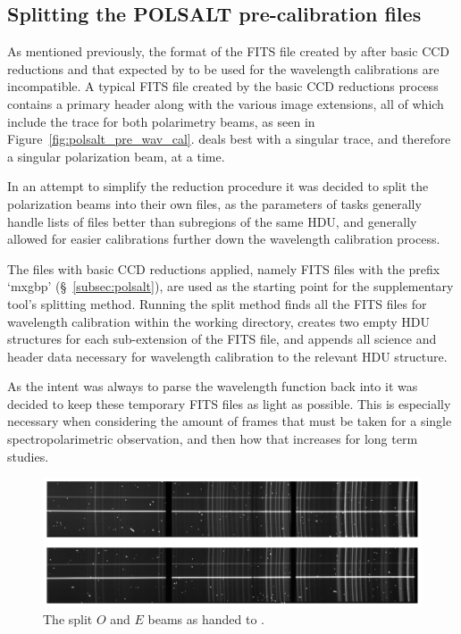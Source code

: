 \subsection{Splitting the POLSALT pre-calibration files}

As mentioned previously, the format of the \gls{FITS} file created by \polsalt after basic \gls{CCD} reductions and that expected by \iraf to be used for the wavelength calibrations are incompatible. A typical \gls{FITS} file created by the \polsalt basic \gls{CCD} reductions process contains a primary header along with the various image extensions, all of which include the trace for both polarimetry beams, as seen in Figure~\ref{fig:polsalt_pre_wav_cal}. \iraf deals best with a singular trace, and therefore a singular polarization beam, at a time.
\prgph

In an attempt to simplify the \iraf reduction procedure it was decided to split the polarization beams into their own files, as the parameters of \iraf tasks generally handle lists of files better than subregions of the same \gls{HDU}, and generally allowed for easier calibrations further down the \iraf wavelength calibration process.
\prgph

The \polsalt files with basic \gls{CCD} reductions applied, namely \gls{FITS} files with the prefix `mxgbp' (\S~\ref{subsec:polsalt}), are used as the starting point for the supplementary tool's splitting method. Running the split method finds all the \gls{FITS} files for wavelength calibration within the working directory, creates two empty \gls{HDU} structures for each sub-extension of the \gls{FITS} file, and appends all science and header data necessary for wavelength calibration to the relevant \gls{HDU} structure.
\prgph

As the intent was always to parse the wavelength function back into \polsalt it was decided to keep these temporary \gls{FITS} files as light as possible. This is especially necessary when considering the amount of frames that must be taken for a single spectropolarimetric observation, and then how that increases for long term studies.
\prgph

\begin{figure}[t]
    \centering
    \includegraphics[width = 1.0\textwidth]{figures/3_OEsplit.pdf}
    \caption{The split $O$ and $E$ beams as handed to \iraf.}
    \label{fig:OE_split}
\end{figure}

